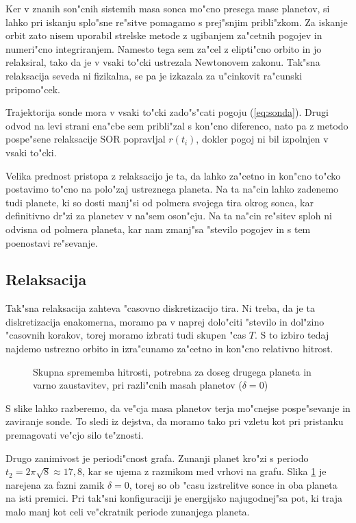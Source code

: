 \documentclass[a4paper,10pt]{article}
\begin{document}
Ker v znanih son"cnih sistemih masa sonca mo"cno presega mase planetov, si lahko pri iskanju splo"sne re"sitve pomagamo s prej"snjim pribli"zkom. Za iskanje orbit zato nisem uporabil strelske metode z ugibanjem za"cetnih pogojev in numeri"cno integriranjem. Namesto tega sem za"cel z elipti"cno orbito in jo relaksiral, tako da je v vsaki to"cki ustrezala Newtonovem zakonu. Tak"sna relaksacija seveda ni fizikalna, se pa je izkazala za u"cinkovit ra"cunski pripomo"cek. 

Trajektorija sonde mora v vsaki to"cki zado"s"cati pogoju (\ref{eq:sonda}). Drugi odvod na levi strani ena"cbe sem pribli"zal s kon"cno diferenco, nato pa z metodo pospe"sene relaksacije SOR popravljal $r(t_i)$, dokler pogoj ni bil izpolnjen v vsaki to"cki.

Velika prednost pristopa z relaksacijo je ta, da lahko za"cetno in kon"cno to"cko postavimo to"cno na polo"zaj ustreznega planeta. Na ta na"cin lahko zadenemo tudi planete, ki so dosti manj"si od polmera svojega tira okrog sonca, kar definitivno dr"zi za planetev v na"sem oson"cju. Na ta na"cin re"sitev sploh ni odvisna od polmera planeta, kar nam zmanj"sa "stevilo pogojev in s tem poenostavi re"sevanje. 

\subsection{Relaksacija}

Tak"sna relaksacija zahteva "casovno diskretizacijo tira. Ni treba, da je ta diskretizacija enakomerna, moramo pa v naprej dolo"citi "stevilo in dol"zino "casovnih korakov, torej moramo izbrati tudi skupen "cas $T$. S to izbiro tedaj najdemo ustrezno orbito in izra"cunamo za"cetno in kon"cno relativno hitrost. 

\begin{figure}[H]
\centering
 
 \caption{Skupna sprememba hitrosti, potrebna za doseg drugega planeta in varno zaustavitev, pri razli"cnih masah planetov ($\delta = 0$)}
 \label{fig:hitrost}
\end{figure}

S slike lahko razberemo, da ve"cja masa planetov terja mo"cnejse pospe"sevanje in zaviranje sonde. To sledi iz dejstva, da moramo tako pri vzletu kot pri pristanku premagovati ve"cjo silo te"znosti. 

Drugo zanimivost je periodi"cnost grafa. Zunanji planet kro"zi s periodo $t_2 = 2\pi\sqrt{8} \approx 17,8$, kar se ujema z razmikom med vrhovi na grafu. Slika \ref{fig:hitrost} je narejena za fazni zamik $\delta=0$, torej so ob "casu izstrelitve sonce in oba planeta na isti premici. Pri tak"sni konfiguraciji je energijsko najugodnej"sa pot, ki traja malo manj kot celi ve"ckratnik periode zunanjega planeta. 
\end{document}
